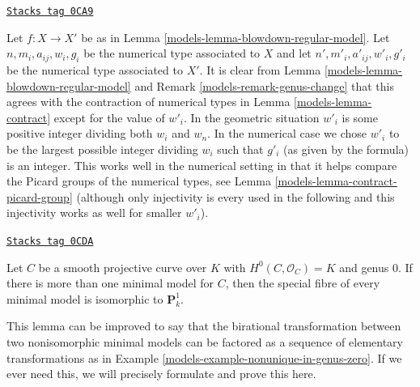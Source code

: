 \begin{remark}
\label{models-remark-compare-contractions}
\href{https://stacks.math.columbia.edu/tag/0CA9}{\texttt{Stacks tag 0CA9}}

Let $f : X \to X'$ be as in Lemma \ref{models-lemma-blowdown-regular-model}.
Let $n, m_i, a_{ij}, w_i, g_i$ be the numerical type associated to $X$ and
let $n', m'_i, a'_{ij}, w'_i, g'_i$ be the numerical type associated to $X'$.
It is clear from Lemma \ref{models-lemma-blowdown-regular-model} and
Remark \ref{models-remark-genus-change}
that this agrees with the contraction of numerical types in
Lemma \ref{models-lemma-contract}
except for the value of $w'_i$.
In the geometric situation $w'_i$ is some positive integer
dividing both $w_i$ and $w_n$. In the numerical case
we chose $w'_i$ to be the largest possible integer dividing
$w_i$ such that $g'_i$ (as given by the formula) is an integer.
This works well in the numerical setting
in that it helps compare the Picard groups
of the numerical types, see Lemma \ref{models-lemma-contract-picard-group}
(although only injectivity is every used in the following and this
injectivity works as well for smaller $w'_i$).
\end{remark}

\begin{lemma}[Nonuniqueness]
\label{models-lemma-nonuniqueness}
\href{https://stacks.math.columbia.edu/tag/0CDA}{\texttt{Stacks tag 0CDA}}

Let $C$ be a smooth projective curve over $K$ with $H^0(C, \mathcal{O}_C) = K$
and genus $0$. If there is more than one minimal model for $C$, then
the special fibre of every minimal model is isomorphic to $\mathbf{P}^1_k$.
\end{lemma}

This lemma can be improved to say that the birational transformation
between two nonisomorphic minimal models can be factored as a sequence of
elementary transformations as in Example \ref{models-example-nonunique-in-genus-zero}.
If we ever need this, we will precisely formulate and prove this here.

